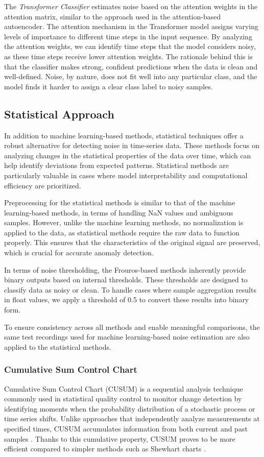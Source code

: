 The \emph{Transformer Classifier} estimates noise based on the attention weights in the attention matrix, similar to the approach used in the attention-based autoencoder. The attention mechanism in the Transformer model assigns varying levels of importance to different time steps in the input sequence. By analyzing the attention weights, we can identify time steps that the model considers noisy, as these time steps receive lower attention weights. The rationale behind this is that the classifier makes strong, confident predictions when the data is clean and well-defined. Noise, by nature, does not fit well into any particular class, and the model finds it harder to assign a clear class label to noisy samples.

\subsection{Statistical Approach}
In addition to machine learning-based methods, statistical techniques offer a robust alternative for detecting noise in time-series data. These methods focus on analyzing changes in the statistical properties of the data over time, which can help identify deviations from expected patterns. Statistical methods are particularly valuable in cases where model interpretability and computational efficiency are prioritized.

Preprocessing for the statistical methods is similar to that of the machine learning-based methods, in terms of handling NaN values and ambiguous samples. However, unlike the machine learning methods, no normalization is applied to the data, as statistical methods require the raw data to function properly. This ensures that the characteristics of the original signal are preserved, which is crucial for accurate anomaly detection.

In terms of noise thresholding, the Frouros-based methods inherently provide binary outputs based on internal thresholds. These thresholds are designed to classify data as noisy or clean. To handle cases where sample aggregation results in float values, we apply a threshold of 0.5 to convert these results into binary form.

To ensure consistency across all methods and enable meaningful comparisons, the same test recordings used for machine learning-based noise estimation are also applied to the statistical methods.

\subsubsection{Cumulative Sum Control Chart}
Cumulative Sum Control Chart (CUSUM) is a sequential analysis technique commonly used in statistical quality control to monitor change detection \cite{basseville1993detection} by identifying moments when the probability distribution of a stochastic process or time series shifts. Unlike approaches that independently analyze measurements at specified times, CUSUM accumulates information from both current and past samples \cite{ncss2024}. Thanks to this cumulative property, CUSUM proves to be more efficient \cite{koshti2011cusum} compared to simpler methods such as Shewhart charts \cite{nelson1984shewhart}.


